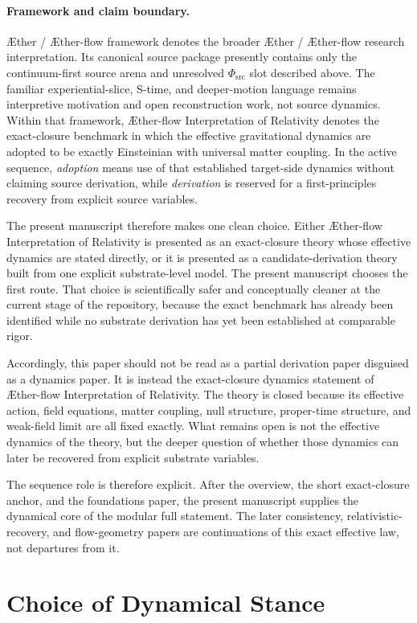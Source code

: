 \documentclass[11pt]{article}
\newcommand{\Aether}{\AE{}ther}
\newcommand{\Aflow}{\AE{}ther-flow}
\newcommand{\TheoryName}{\Aflow{} Interpretation of Relativity}
\newcommand{\TheoryProgram}{\Aether{} / \Aflow{} framework}
\newcommand{\PhiSrc}{\Phi_{\mathrm{src}}}
\begin{document}
\paragraph{Framework and claim boundary.}
\TheoryProgram{} denotes the broader \Aether{} / \Aflow{} research
interpretation. Its canonical source package presently contains only the
continuum-first source arena and unresolved \(\PhiSrc\) slot described above.
The familiar experiential-slice, S-time, and deeper-motion language remains
interpretive motivation and open reconstruction work, not source dynamics.
Within that framework, \TheoryName{} denotes the exact-closure benchmark in
which the effective gravitational dynamics are adopted to be exactly
Einsteinian with universal matter coupling. In the active sequence,
\emph{adoption} means use of that established target-side dynamics without
claiming source derivation, while \emph{derivation} is reserved for a
first-principles recovery from explicit source variables.

The present manuscript therefore makes one clean choice. Either \TheoryName{} is presented as an exact-closure theory whose effective dynamics are stated directly, or it is presented as a candidate-derivation theory built from one explicit substrate-level model. The present manuscript chooses the first route. That choice is scientifically safer and conceptually cleaner at the current stage of the repository, because the exact benchmark has already been identified while no substrate derivation has yet been established at comparable rigor.

Accordingly, this paper should not be read as a partial derivation paper disguised as a dynamics paper. It is instead the exact-closure dynamics statement of \TheoryName{}. The theory is closed because its effective action, field equations, matter coupling, null structure, proper-time structure, and weak-field limit are all fixed exactly. What remains open is not the effective dynamics of the theory, but the deeper question of whether those dynamics can later be recovered from explicit substrate variables.

The sequence role is therefore explicit. After the overview, the short exact-closure anchor, and the foundations paper, the present manuscript supplies the dynamical core of the modular full statement. The later consistency, relativistic-recovery, and flow-geometry papers are continuations of this exact effective law, not departures from it.

\section{Choice of Dynamical Stance}
\end{document}
